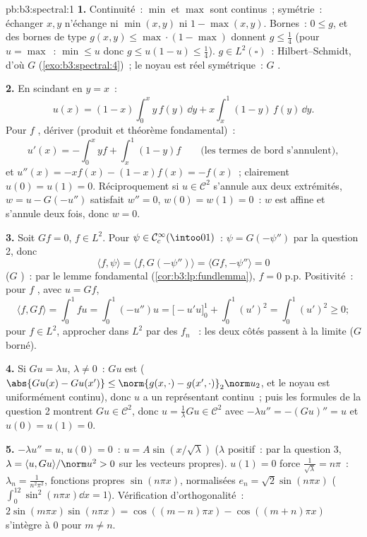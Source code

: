 \begin{solution}{pb:b3:spectral:1}
\textbf{1.} Continuité~: $\min$ et $\max$ sont continus~;
symétrie~: échanger $x, y$ n'échange ni $\min(x,y)$ ni $1 -
\max(x,y)$. Bornes~: $0 \leq g$, et des bornes de type
$g(x,y) \leq \max\cdot(1-\max)$ donnent $g \leq \frac14$
(pour $u = \max$~: $\min \leq u$ donc $g \leq u(1-u) \leq
\frac14$). $g \in L^2(\square)$~: Hilbert--Schmidt, d'où $G$
 (\cref{exo:b3:spectral:4})~; le noyau est réel
symétrique~: $G$ .

\textbf{2.} En scindant en $y = x$~:
\[
u(x) = (1 - x)\int_0^x y\,f(y)\,\dd y +
x\int_x^1(1 - y)\,f(y)\,\dd y .
\]
Pour $f$ , dériver (produit et théorème fondamental)~:
\[
u'(x) = -\int_0^xyf + \int_x^1(1-y)f
\qquad\text{(les termes de bord s'annulent)},
\]
et $u''(x) = -xf(x) - (1 - x)f(x) = -f(x)$~; clairement $u(0)
= u(1) = 0$. Réciproquement si $u \in \mathcal C^2$ s'annule
aux deux extrémités, $w = u - G(-u'')$ satisfait $w'' = 0$,
$w(0) = w(1) = 0$~: $w$ est affine et s'annule deux fois,
donc $w = 0$.

\textbf{3.} Soit $Gf = 0$, $f \in L^2$. Pour $\psi \in
\mathcal C_c^\infty(\intoo01)$~: $\psi = G(-\psi'')$ par la
question 2, donc
\[
\langle f, \psi\rangle = \langle f, G(-\psi'')\rangle
= \langle Gf, -\psi''\rangle = 0
\]
($G$ )~: par le lemme fondamental
(\cref{cor:b3:lp:fundlemma}), $f = 0$ p.p. Positivité~: pour
$f$ , avec $u = Gf$,
\[
\langle f, Gf\rangle = \int_0^1 fu = \int_0^1(-u'')u
= \bigl[-u'u\bigr]_0^1 + \int_0^1(u')^2 = \int_0^1(u')^2
\geq 0 ;
\]
pour $f \in L^2$, approcher dans $L^2$ par des $f_n$
~: les deux côtés passent à la limite ($G$ borné).

\textbf{4.} Si $Gu = \lambda u$, $\lambda \neq 0$~: $Gu$ est
 ($\abs{Gu(x) - Gu(x')} \leq \norm{g(x,\cdot) -
g(x',\cdot)}_2\norm u_2$, et le noyau est uniformément
continu), donc $u$ a un représentant continu~; puis les
formules de la question 2 montrent $Gu \in \mathcal C^2$,
donc $u = \frac1\lambda Gu \in \mathcal C^2$ avec $-\lambda
u'' = -(Gu)'' = u$ et $u(0) = u(1) = 0$.

\textbf{5.} $-\lambda u'' = u$, $u(0) = 0$~: $u =
A\sin(x/\sqrt\lambda)$ ($\lambda$ positif~: par la question
3, $\lambda = \langle u, Gu\rangle/\norm u^2 > 0$ sur les
vecteurs propres). $u(1) = 0$ force $\frac1{\sqrt\lambda} =
n\pi$~: $\lambda_n = \frac1{n^2\pi^2}$, fonctions propres
$\sin(n\pi x)$, normalisées $e_n = \sqrt2\sin(n\pi x)$
($\int_0^12\sin^2(n\pi x)\dd x = 1$). Vérification
d'orthogonalité~: $2\sin(m\pi x)\sin(n\pi x) =
\cos((m-n)\pi x) - \cos((m+n)\pi x)$ s'intègre à $0$ pour $m
\neq n$.


\end{solution}
